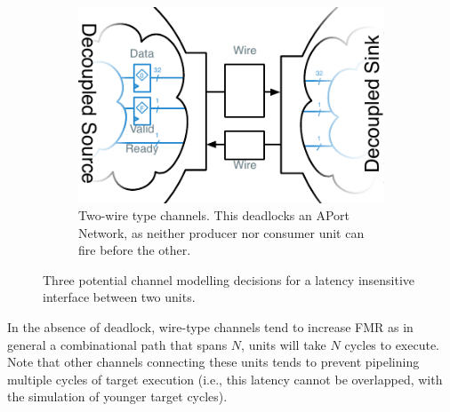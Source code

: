 \begin{figure}
\begin{subfigure}[t]{0.49\textwidth}
    \end{subfigure}
    \begin{subfigure}[t]{0.49\textwidth}
        \captionsetup{margin=0.25cm}
        \includegraphics[width=\columnwidth]{figures/li-wire-channel-manual.pdf}
        \caption{Two-wire type channels. This deadlocks an APort Network, as neither producer nor consumer unit can fire
        before the other.}
    \end{subfigure}
    \centering
    \vspace{-0.25in}
    \caption{Three potential channel modelling decisions for a latency insensitive interface between two units.}
    \label{fig:channel-deadlock}
\end{figure}

In the absence of deadlock, wire-type channels tend to increase FMR as in
general a combinational path that spans $N$, units will take $N$ cycles to
execute. Note that other channels connecting these units tends to prevent
pipelining multiple cycles of target execution (i.e., this latency cannot be
overlapped, with the simulation of younger target cycles).

